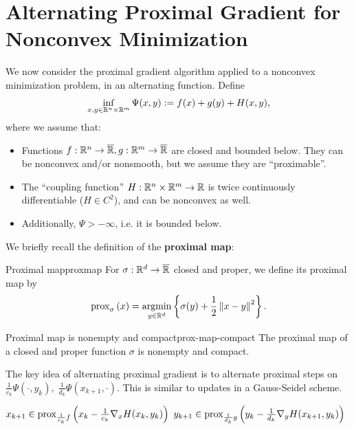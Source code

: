 \section{Alternating Proximal Gradient for Nonconvex Minimization}
We now consider the proximal gradient algorithm applied to a nonconvex 
minimization problem, in an alternating function. Define
\begin{align}
    \inf_{x, y \in \mathbb{R}^n \times \mathbb{R}^m}
    \Psi(x, y) := f(x) + g(y) + H(x, y), \label{eq:nonconvex-prob}
\end{align}
where we assume that:
\begin{itemize}
\item Functions $f: \mathbb{R}^n \to \overline{\mathbb{R}}, g : \mathbb{R}^m \to \overline{\mathbb{R}}$
are closed and bounded below. They can be nonconvex and/or nonsmooth, but we
assume they are ``proximable''.
\item The ``coupling function'' $H: \mathbb{R}^n \times \mathbb{R}^m \to \mathbb{R}$ is twice
continuously differentiable ($H \in C^2$), and can be nonconvex as well.
\item Additionally, $\Psi > -\infty$, i.e. it is bounded below.
\end{itemize}

We briefly recall the definition of the \textbf{proximal map}:

\begin{cdefinition}{Proximal map}{proxmap}
    For $\sigma: \mathbb{R}^d \to \overline{\mathbb{R}}$ closed and proper, we define its
    proximal map by
    \[
        \mathrm{prox}_{\sigma}\left( x \right) = \operatorname*{argmin}_{y \in \mathbb{R}^d} \left\{ \sigma(y) +
        \frac{1}{2} \left \| x - y \right \|^2 \right\}.
    \]
\end{cdefinition}

\begin{exercise}{Proximal map is nonempty and compact}{prox-map-compact}
    The proximal map of a closed and proper function $\sigma$ is nonempty
    and compact.
\end{exercise}

The key idea of alternating proximal gradient is to alternate proximal steps on
$\frac{1}{c_k}\Psi(\cdot, y_k), \; \frac{1}{d_k} \Psi(x_{k+1}, \cdot)$. This is
similar to updates in a Gauss-Seidel scheme.

\begin{algorithm}
    \caption{Alternating Proximal Gradient}
    \begin{algorithmic}
            \State $x_{k+1} \in \mathrm{prox}_{\frac{1}{c_k}f}\left( x_k - \frac{1}{c_k}
                \nabla_x H(x_k, y_k) \right)$
            \State $y_{k+1} \in \mathrm{prox}_{\frac{1}{d_k}g}\left( y_k - \frac{1}{d_k}
                \nabla_y H(x_{k+1}, y_k) \right)$
    \end{algorithmic}
    \label{alg:alternating-prox-grad}
\end{algorithm}

